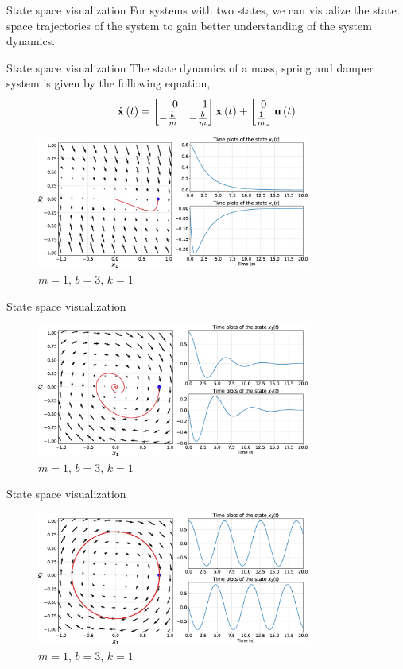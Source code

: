 \documentclass[aspectratio=169]{beamer}
\def\mf{\ensuremath\mathbf}
\def\lp{\ensuremath\left(}
\def\rp{\ensuremath\right)}
\def\bmx{\ensuremath\begin{bmatrix*}[r]}
\def\emx{\ensuremath\end{bmatrix*}}
\newcommand{\ct}[1]{\lp #1\rp}
\begin{document}
\begin{frame}[t]{State space visualization}
For systems with two states, we can  visualize the state space trajectories of the system to gain better understanding of the system dynamics.

\end{frame}


\begin{frame}[t]{State space visualization}
The state dynamics of a mass, spring and damper system is given by the following equation,
\[ \dot{\mf{x}}\ct{t} = \bmx 0 & 1\\ -\frac{k}{m} & -\frac{b}{m}\emx \mf{x}\ct{t} + \bmx 0 \\ \frac{1}{m}\emx \mf{u}\ct{t} \]

\vspace{-0.3cm}
\begin{figure}
    \includegraphics[width=0.8\textwidth]{img/overdamped.eps}
    \captionsetup{labelformat=empty}
    \caption{\small $m=1, \, b=3, \, k=1$}
\end{figure}

\end{frame}

\begin{frame}[t]{State space visualization}
\begin{figure}
    \includegraphics[width=0.8\textwidth]{img/underdamped.eps}
    \captionsetup{labelformat=empty}
    \caption{\small $m=1, \, b=3, \, k=1$}
\end{figure}

\end{frame}

\begin{frame}[t]{State space visualization}
\begin{figure}
    \includegraphics[width=0.8\textwidth]{img/undamped.eps}
    \captionsetup{labelformat=empty}
    \caption{\small $m=1, \, b=3, \, k=1$}
\end{figure}

\end{frame}
\end{document}
